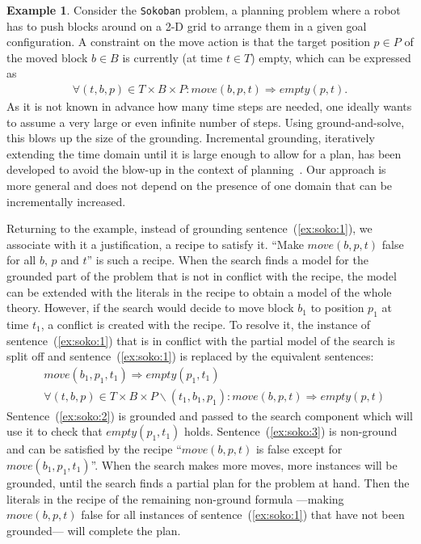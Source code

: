 \documentclass[11pt]{article}
\newcommand{\m}[1]{\ensuremath{#1}\xspace}
\newcommand{\limplies}{\m{\Rightarrow}}
\newcommand{\elim}{\m{\backslash}}
\theoremstyle{plain}
\theoremstyle{definition}
\theoremstyle{example_basic}
\newtheorem{example}[thm]{Example}
\theoremstyle{example_contd}
\theoremstyle{plain}
\newcommand{\change}[1]{#1}
\begin{document}
\begin{example}\label{ex:sokoban}
Consider the \texttt{Sokoban} problem, a planning problem where a robot
has to push blocks around on a 2-D grid to arrange them in a given goal
configuration.
A constraint on the move action is that the target position $p \in P$ of the moved block $b \in B$ is currently (at time $t \in T$) empty, which can be expressed as 
\begin{align}
\forall (t,b,p) \in T \times B \times P: move(b, p,t) \limplies empty(p, t).\label{ex:soko:1}
\end{align} 
As it is not known in advance how many time steps are needed, one ideally wants to assume a very large or even infinite number of steps. Using ground-and-solve, this blows up the size of the grounding.
\change{Incremental grounding, iteratively extending the time domain until it is large enough to allow for a plan, has been developed to avoid the blow-up in the context of planning~\shortcite{iclp/GebserKKOST08}. Our approach is more general and does not depend on the presence of one domain that can be incrementally increased.}

\change{Returning to the example, instead of grounding
  sentence~(\ref{ex:soko:1}), we associate with it a justification, a
  recipe to satisfy it. ``Make $move(b,p,t)$ false for all
  $b$, $p$ and $t$'' is such a recipe. When the search finds a model
  for the grounded part of the problem that is not in conflict with
  the recipe, the model can be extended with the literals in the
  recipe to obtain a model of the whole theory. However, if the
  search would decide to move block $b_1$ to position $p_1$ at time $t_1$,
  a conflict is created with the recipe. To resolve it, the instance
  of sentence~(\ref{ex:soko:1}) that is in conflict with the partial
  model of the search is split off and sentence~(\ref{ex:soko:1})
  is replaced by the equivalent sentences:
\begin{align}
&move(b_1, p_1,t_1) \limplies empty(p_1, t_1)\label{ex:soko:2} \\
&\forall (t,b,p) \in T \times B \times P\elim (t_1,b_1,p_1): move(b, p,t) \limplies empty(p, t)\label{ex:soko:3}
\end{align}
Sentence~(\ref{ex:soko:2}) is grounded and passed to the search
component which will use it to check that $empty(p_1, t_1)$ holds.
Sentence~(\ref{ex:soko:3}) is non-ground and can be satisfied by
the recipe ``$move(b,p,t)$ is false except for
$move(b_1,p_1,t_1)$''. When the search makes more moves, more
instances will be grounded, until the search finds a partial plan for
the problem at hand. Then the literals in the recipe of the remaining
non-ground formula ---making  $move(b,p,t)$ false for all 
instances of sentence~(\ref{ex:soko:1}) that have not been grounded--- will complete the plan.
}
\end{example}
\end{document}
